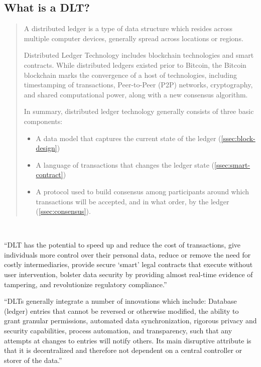 \subsection{What is a DLT?}

\begin{quotation}
A distributed ledger is a type of data structure which resides across multiple computer devices, generally spread across locations or regions.

Distributed Ledger Technology includes blockchain technologies and smart contracts. While distributed ledgers existed prior to Bitcoin, the Bitcoin blockchain marks the convergence of a host of technologies, including timestamping of transactions, Peer-to-Peer (P2P) networks, cryptography, and shared computational power, along with a new consensus algorithm. 

In summary, distributed ledger technology generally consists of three basic components:
\begin{itemize}
\item A data model that captures the current state of the ledger (\autoref{ssec:block-design})
\item A language of transactions that changes the ledger state (\autoref{ssec:smart-contract})
\item A protocol used to build consensus among participants around which transactions will be accepted, and in what order, by the ledger (\autoref{ssec:consensus}).
\end{itemize}
\end{quotation}~\cite{LFS171x}

``DLT has the potential to speed up and reduce the cost of transactions, give individuals more control over their personal data, reduce or remove the need for costly intermediaries, provide secure ‘smart’ legal contracts that execute without user intervention, bolster data security by providing almost real-time evidence of tampering, and revolutionize regulatory compliance.''~\cite{itu2017}

``DLTs generally integrate a number of innovations which include: Database (ledger) entries that cannot be reversed or otherwise modified, the ability to grant granular permissions, automated data synchronization, rigorous privacy and security capabilities, process automation, and transparency, such that any attempts at changes to entries will notify others. Its main disruptive attribute is that it is decentralized and therefore not dependent on a central controller or storer of the data.''~\cite{itu2017}

